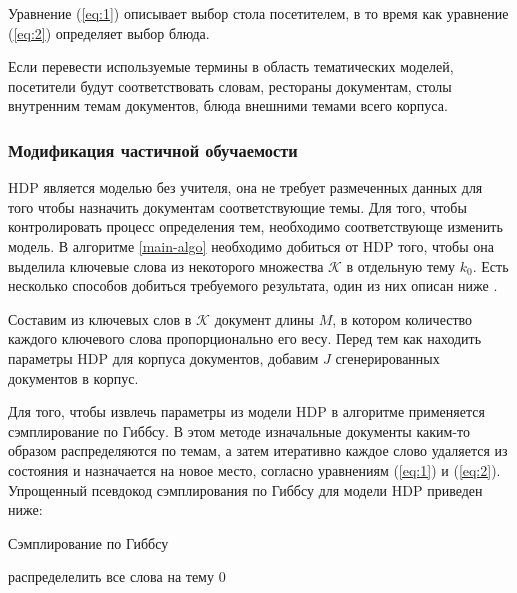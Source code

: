 \documentclass[12pt, a4paper]{article}
\begin{document}
  Уравнение (\ref{eq:1}) описывает выбор стола посетителем, в то время как уравнение (\ref{eq:2}) определяет выбор блюда.
  
  Если перевести используемые термины в область тематических моделей, посетители будут соответствовать словам, рестораны документам, столы внутренним темам документов, блюда внешними темами всего корпуса\cite{hdp-1}.
  
  \subsubsection{Модификация частичной обучаемости}
  HDP является моделью без учителя, она не требует размеченных данных для того чтобы назначить документам соответствующие темы. Для того, чтобы контролировать процесс определения тем, необходимо соответствующе изменить модель. В алгоритме \ref{main-algo} необходимо добиться от HDP того, чтобы она выделила ключевые слова из некоторого множества $\mathcal{K}$ в отдельную тему $k_0$. Есть несколько способов добиться требуемого результата, один из них описан ниже \cite{ss-learning}.
  
	Составим из ключевых слов в $\mathcal{K}$ документ длины $M$, в котором количество каждого ключевого слова пропорционально его весу. Перед тем как находить параметры HDP для корпуса документов, добавим $J$ сгенерированных документов в корпус. 
	
  Для того, чтобы извлечь параметры из модели HDP в алгоритме применяется сэмплирование по Гиббсу. В этом методе изначальные документы каким-то образом распределяются по темам, а затем итеративно каждое слово удаляется из состояния и назначается на новое место, согласно уравнениям (\ref{eq:1}) и (\ref{eq:2}). Упрощенный псевдокод сэмплирования по Гиббсу для модели HDP приведен ниже:
  
  \begin{algorithm}[H]
  	\caption{Сэмплирование по Гиббсу}
  	распределелить все слова на тему 0\;
  \end{algorithm}
  
\end{document}
